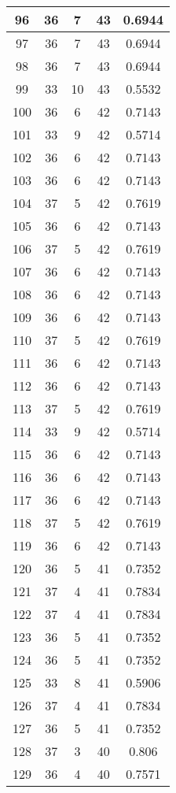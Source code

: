 \documentclass[letterpaper, 12pt]{article}
\begin{document}
\begin{longtable}{|c|c|c|c|c|}
\hline
96 & 36 & 7 & 43 & 0.6944 \\
\hline
97 & 36 & 7 & 43 & 0.6944 \\
\hline
98 & 36 & 7 & 43 & 0.6944 \\
\hline
99 & 33 & 10 & 43 & 0.5532 \\
\hline
100 & 36 & 6 & 42 & 0.7143 \\
\hline
101 & 33 & 9 & 42 & 0.5714 \\
\hline
102 & 36 & 6 & 42 & 0.7143 \\
\hline
103 & 36 & 6 & 42 & 0.7143 \\
\hline
104 & 37 & 5 & 42 & 0.7619 \\
\hline
105 & 36 & 6 & 42 & 0.7143 \\
\hline
106 & 37 & 5 & 42 & 0.7619 \\
\hline
107 & 36 & 6 & 42 & 0.7143 \\
\hline
108 & 36 & 6 & 42 & 0.7143 \\
\hline
109 & 36 & 6 & 42 & 0.7143 \\
\hline
110 & 37 & 5 & 42 & 0.7619 \\
\hline
111 & 36 & 6 & 42 & 0.7143 \\
\hline
112 & 36 & 6 & 42 & 0.7143 \\
\hline
113 & 37 & 5 & 42 & 0.7619 \\
\hline
114 & 33 & 9 & 42 & 0.5714 \\
\hline
115 & 36 & 6 & 42 & 0.7143 \\
\hline
116 & 36 & 6 & 42 & 0.7143 \\
\hline
117 & 36 & 6 & 42 & 0.7143 \\
\hline
118 & 37 & 5 & 42 & 0.7619 \\
\hline
119 & 36 & 6 & 42 & 0.7143 \\
\hline
120 & 36 & 5 & 41 & 0.7352 \\
\hline
121 & 37 & 4 & 41 & 0.7834 \\
\hline
122 & 37 & 4 & 41 & 0.7834 \\
\hline
123 & 36 & 5 & 41 & 0.7352 \\
\hline
124 & 36 & 5 & 41 & 0.7352 \\
\hline
125 & 33 & 8 & 41 & 0.5906 \\
\hline
126 & 37 & 4 & 41 & 0.7834 \\
\hline
127 & 36 & 5 & 41 & 0.7352 \\
\hline
128 & 37 & 3 & 40 & 0.806 \\
\hline
129 & 36 & 4 & 40 & 0.7571 \\

\end{longtable}
\end{document}
